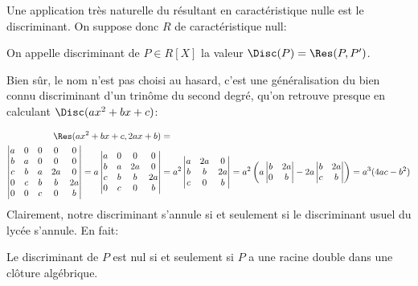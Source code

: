 \documentclass{article}
\begin{document}
Une application très naturelle du résultant en caractéristique nulle est le discriminant. On suppose donc $R$ de caractéristique null:

\begin{definition}
    On appelle discriminant de $P \in R[X]$ la valeur $\Disc(P) = \Res(P, P')$.
\end{definition}

Bien sûr, le nom n'est pas choisi au hasard, c'est une généralisation du bien connu discriminant d'un trinôme du second degré, qu'on retrouve presque en calculant $\Disc(ax^2 + bx + c)$:

\begin{align*}
    \Res(ax^2 + bx + c, 2ax + b) & =                   \\
    \begin{vmatrix}
        a & 0 & 0 & 0  & 0  \\
        b & a & 0 & 0  & 0  \\
        c & b & a & 2a & 0  \\
        0 & c & b & b  & 2a \\
        0 & 0 & c & 0  & b
    \end{vmatrix}
    = a\begin{vmatrix}
           a & 0 & 0  & 0  \\
           b & a & 2a & 0  \\
           c & b & b  & 2a \\
           0 & c & 0  & b
       \end{vmatrix}
                                 & = a^2\begin{vmatrix}
                                            a & 2a & 0  \\
                                            b & b  & 2a \\
                                            c & 0  & b
                                        \end{vmatrix}
    = a^2\left(a\begin{vmatrix}
                    b & 2a \\
                    0 & b
                \end{vmatrix} - 2a\begin{vmatrix}
                                      b & 2a \\
                                      c & b
                                  \end{vmatrix}\right)
    = a^3(4ac - b^2)
\end{align*}
Clairement, notre discriminant s'annule si et seulement si le discriminant usuel du lycée s'annule. En fait:
\begin{proposition}
    Le discriminant de $P$ est nul si et seulement si $P$ a une racine double dans une clôture algébrique.
\end{proposition}
\end{document}
